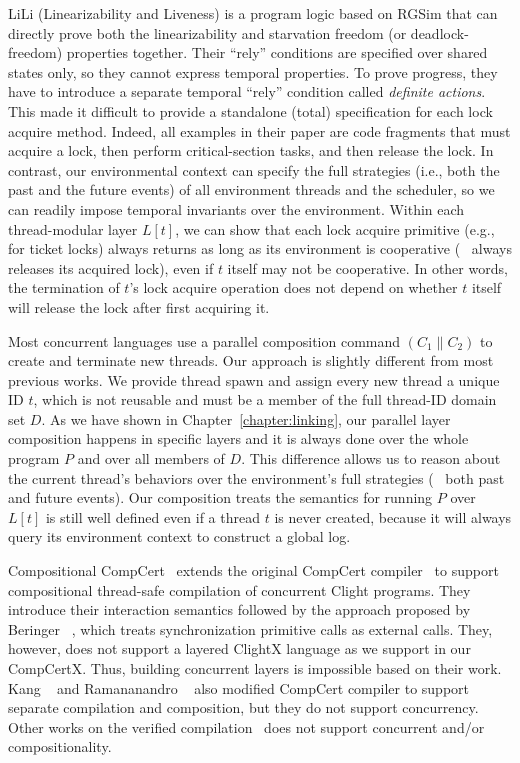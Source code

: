 LiLi (Linearizability and Liveness) is a program logic based on RGSim
that can
directly prove both the linearizability and starvation freedom (or
deadlock-freedom) properties together. 
Their ``rely'' conditions are specified
over shared states only, so they cannot express temporal properties. 
To prove progress, they have to introduce a separate temporal ``rely''
condition called {\em definite actions}.  This made it difficult to
provide a standalone (total) specification for each lock acquire
method.  Indeed, all examples in their paper are code fragments that
must acquire a lock, then perform critical-section tasks, and then release the
lock. In contrast, our environmental context can specify the full
strategies (i.e., both the past and the future events) of all
environment threads and the scheduler, so we can readily impose
temporal invariants over the environment. Within each thread-modular
layer $L[t]$, we can show that each lock acquire primitive (e.g., for
ticket locks) always returns as long as its environment is cooperative
(\eg~ always releases its acquired lock), even if $t$ itself may not
be cooperative.
In other words, the termination of $t$'s lock acquire
operation does not depend on whether $t$ itself will release the lock
after first acquiring it.

Most concurrent languages use a
parallel composition command $(C_1 \| C_2)$ to create and terminate
new threads.  
Our approach is slightly different from most previous works.
We provide thread spawn and assign every new thread a unique ID $t$,
which is not reusable and must be a member of the full thread-ID domain set $D$.
As we have shown in Chapter~\ref{chapter:linking},
our parallel layer composition happens in specific layers and it is
always done over the whole program $P$ and over
all members of $D$. 
This difference allows us to reason about the current
thread's behaviors over the environment's full strategies (\ie~ both
past and future events).
Our composition treats the semantics for running $P$ over $L[t]$ is still well
defined even if a thread $t$ is never
created, because it will always query its environment context to
construct a global log.



Compositional CompCert~\cite{stewart15} extends the original CompCert compiler~\cite{compcert}  
to support compositional thread-safe compilation of concurrent Clight programs. 
They introduce their interaction semantics followed by the approach proposed by Beringer \etal~\cite{beringer14}, which treats
synchronization
primitive calls as external calls.
They, however, does not support a layered ClightX language as we support in our CompCertX.  
Thus, building concurrent layers is impossible based on their work.
Kang \etal~\cite{hur16} and Ramananandro \etal~\cite{ramananandro:2015} also modified CompCert compiler to support separate compilation and composition, 
but they do not support concurrency.  
Other works on the verified compilation~\cite{Lochbihler10esop, Sevcik11popl, zhao:2013, kang:2018} does not support concurrent and/or compositionality. 


